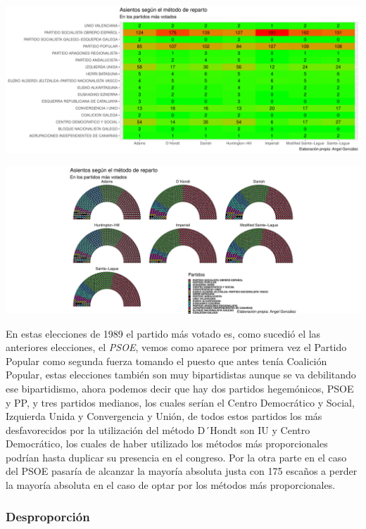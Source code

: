 \documentclass[12pt,a4paper,]{book}
\numberwithin{dummy}{section}
\theoremstyle{ocrenumbox}
\theoremstyle{blacknumex}
\theoremstyle{blacknumbox}
\theoremstyle{ocrenum}
\theoremstyle{ocrenum}
\begin{document}
\begin{center}\includegraphics[width=0.95\linewidth]{figurasR/unnamed-chunk-95-2} \end{center}

\begin{center}\includegraphics[width=0.95\linewidth]{figurasR/unnamed-chunk-95-3} \end{center}

En estas elecciones de 1989 el partido más votado es, como sucedió el
las anteriores elecciones, el \emph{PSOE}, vemos como aparece por
primera vez el Partido Popular como segunda fuerza tomando el puesto que
antes tenía Coalición Popular, estas elecciones también son muy
bipartidistas aunque se va debilitando ese bipartidismo, ahora podemos
decir que hay dos partidos hegemónicos, PSOE y PP, y tres partidos
medianos, los cuales serían el Centro Democrático y Social, Izquierda
Unida y Convergencia y Unión, de todos estos partidos los más
desfavorecidos por la utilización del método D´Hondt son IU y Centro
Democrático, los cuales de haber utilizado los métodos más
proporcionales podrían hasta duplicar su presencia en el congreso. Por
la otra parte en el caso del PSOE pasaría de alcanzar la mayoría
absoluta justa con 175 escaños a perder la mayoría absoluta en el caso
de optar por los métodos más proporcionales.

\hypertarget{desproporciuxf3n-4}{%
\subsubsection{Desproporción}\label{desproporciuxf3n-4}}
\end{document}
